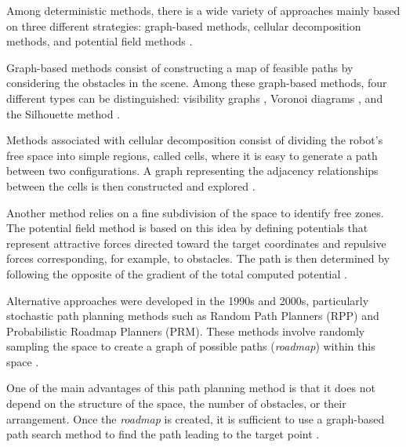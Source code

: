 \documentclass[../main.tex]{subfiles}
\begin{document}
\vspace{1em}

Among deterministic methods, there is a wide variety of approaches mainly based on three different strategies: graph-based methods, cellular decomposition methods, and potential field methods \cite{latombe_robot_1991,bhattacharyya_robot_2008}.

\vspace{1em}

Graph-based methods consist of constructing a map of feasible paths by considering the obstacles in the scene. Among these graph-based methods, four different types can be distinguished: visibility graphs \cite{visibility_graph_1979}, Voronoi diagrams \cite{garrido_path_2006}, and the Silhouette method \cite{bhattacharyya_robot_2008}.

\vspace{1em}

Methods associated with cellular decomposition consist of dividing the robot's free space into simple regions, called cells, where it is easy to generate a path between two configurations. A graph representing the adjacency relationships between the cells is then constructed and explored \cite{latombe_robot_1991,zhu_new_1991,kedem_efficient_1990,avnaim_practical_1988}.

\vspace{1em}

Another method relies on a fine subdivision of the space to identify free zones. The potential field method is based on this idea by defining potentials that represent attractive forces directed toward the target coordinates and repulsive forces corresponding, for example, to obstacles. The path is then determined by following the opposite of the gradient of the total computed potential \cite{latombe_robot_1991,koren_potential_1991}.

\vspace{1em}

Alternative approaches were developed in the 1990s and 2000s, particularly stochastic path planning methods such as Random Path Planners (RPP) and Probabilistic Roadmap Planners (PRM). These methods involve randomly sampling the space to create a graph of possible paths (\textit{roadmap}) within this space \cite{amato_1996,hsu_2002,nissoux_1999}.

\vspace{1em}

One of the main advantages of this path planning method is that it does not depend on the structure of the space, the number of obstacles, or their arrangement. Once the \textit{roadmap} is created, it is sufficient to use a graph-based path search method to find the path leading to the target point \cite{gasparetto_2015}.
\end{document}
